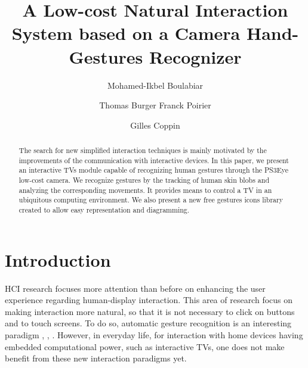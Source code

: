 \documentclass{llncs}
\begin{document}
\frontmatter %
\pagestyle{empty} %
\mainmatter %
%
\title{A Low-cost Natural Interaction System based on a Camera Hand-Gestures Recognizer}
\author{Mohamed-Ikbel Boulabiar \and Thomas Burger
Franck Poirier \and Gilles Coppin}
%

\maketitle

\begin{abstract}
The search for new simplified interaction techniques is
mainly motivated by the improvements of
the communication with interactive devices.
In this paper, we present an interactive TVs module capable
of recognizing human gestures through the PS3Eye low-cost camera.
We recognize gestures by the tracking of human skin blobs and analyzing the
corresponding movements. It provides means to control a TV in an ubiquitous
computing environment.
We also present a new free gestures icons library created to allow easy
representation and diagramming.

\end{abstract}
%

\section{Introduction}
HCI research focuses more attention than before on enhancing the user
experience regarding human-display interaction.
This area of research focus on making interaction more natural, so that it is not necessary to click on buttons and to touch screens. To do so, automatic gesture recognition is an interesting paradigm \cite{Bolt1980}, \cite{Pavlovic97visinter}, \cite{Derpanisreview}.
However, in everyday life, for interaction with home devices having
embedded computational power, such as interactive TVs, one does not make benefit from these new interaction paradigms yet.
\end{document}
